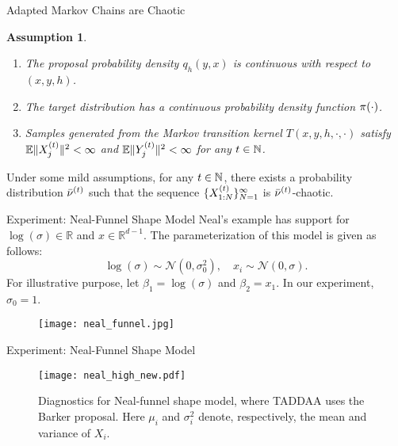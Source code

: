\documentclass[10pt,xcolor=table]{beamer}
\newtheorem{assumption}{Assumption}
\begin{document}
\begin{frame}{Adapted Markov Chains are Chaotic}
\begin{assumption} 
	\label{assumption}
	\begin{enumerate}
		\item \label{assumption1}%
		The proposal probability density $q_{h}(y, x)$ is continuous with respect to $(x, y, h)$.
		\item \label{assumption2}%
		The target distribution has a continuous probability density function $\pi(\cdot)$.
		\item \label{assumption3}%
		Samples generated from the Markov transition kernel $T (x, y, h, \cdot, \cdot )$ satisfy $\mathbb{E} \|X_{j}^{(t)}\|^{2} < \infty$ and $\mathbb{E} \|Y_{j}^{(t)}\|^{2} < \infty$ for any $t \in \mathbb{N}$.
	\end{enumerate}
\end{assumption}
\begin{theorem}
\label{propagation of chaos for x}
Under some mild assumptions, for any $t \in \mathbb{N}$, there exists a probability 
distribution $\bar{\nu}^{(t)}$ such that the sequence 
$\{X_{1:N}^{(t)}\}_{N=1}^{\infty}$ is $\bar{\nu}^{(t)}$-chaotic.
\end{theorem}

\end{frame}

\begin{frame}{Experiment: Neal-Funnel Shape Model}
Neal's example has support for $\log(\sigma) \in \mathbb{R}$ and $x \in \mathbb{R}^{d-1}$. The parameterization of this model is given as follows:
$$
    \log(\sigma) \sim \mathcal{N}(0, \sigma_{0}^{2}), \quad x_{i} \sim \mathcal{N}(0,\sigma).
$$
For illustrative purpose, let $\beta_{1}=\log(\sigma)$ and $\beta_{2}=x_{1}$. In our experiment, $\sigma_{0}=1$.
\begin{figure}
    \centering 
    \texttt{[image: neal\_funnel.jpg]}
\end{figure}
\end{frame}

\begin{frame}{Experiment: Neal-Funnel Shape Model}
\begin{figure}[t]
    \texttt{[image: neal\_high\_new.pdf]}
    \caption{Diagnostics for Neal-funnel shape model, where 
        TADDAA uses the Barker proposal. 
        Here $\mu_{i}$ and $\sigma_{i}^{2}$ denote, respectively, the mean and variance of $X_{i}$. }
    \label{fig:High Dimensional Neal Funnel Diagnostics}
\end{figure}
\end{frame}
\end{document}
